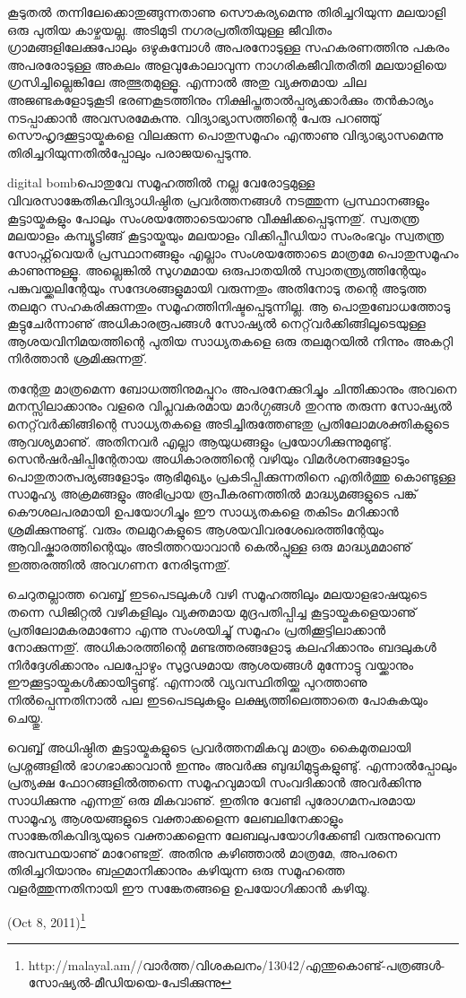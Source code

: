 കൂടുതല്‍ തന്നിലേക്കൊതുങ്ങുന്നതാണു സൌകര്യമെന്നു തിരിച്ചറിയുന്ന മലയാളി ഒരു പുതിയ കാഴ്ചയല്ല. അടിമുടി നഗരപ്രതീതിയുള്ള
 ജീവിതം ഗ്രാമങ്ങളിലേക്കുപോലും ഒഴുകുമ്പോള്‍ അപരനോടുള്ള സഹകരണത്തിനു പകരം അപരരോടുള്ള അകലം അളവുകോലാവുന്ന 
നാഗരികജീവിതരീതി മലയാളിയെ ഗ്രസിച്ചില്ലെങ്കിലേ അത്ഭുതമുള്ളൂ. എന്നാല്‍ അതു വ്യക്തമായ ചില അജണ്ടകളോടുകൂടി ഭരണകൂടത്തിനും
 നിക്ഷിപ്തതാല്‍പ്പര്യക്കാര്‍ക്കും തന്‍കാര്യം നടപ്പാക്കാന്‍ അവസരമേകുന്നു. വിദ്യാഭ്യാസത്തിന്റെ പേരു പറഞ്ഞു് സൌഹൃദക്കൂട്ടായ്മകളെ 
വിലക്കുന്ന പൊതുസമൂഹം എന്താണു വിദ്യാഭ്യാസമെന്നു തിരിച്ചറിയുന്നതില്‍പ്പോലും പരാജയപ്പെടുന്നു.

digital bombപൊതുവേ സമൂഹത്തില്‍ നല്ല വേരോട്ടമുള്ള വിവരസാങ്കേതികവിദ്യാധിഷ്ഠിത പ്രവര്‍ത്തനങ്ങള്‍ നടത്തുന്ന 
പ്രസ്ഥാനങ്ങളും കൂട്ടായ്മകളും പോലും സംശയത്തോടെയാണു വീക്ഷിക്കപ്പെടുന്നതു്. സ്വതന്ത്ര മലയാളം കമ്പ്യൂട്ടിങ്ങ് കൂട്ടായ്മയും മലയാളം 
വിക്കിപ്പീഡിയാ സംരംഭവും സ്വതന്ത്ര സോഫ്റ്റ്‌വെയര്‍ പ്രസ്ഥാനങ്ങളും എല്ലാം സംശയത്തോടെ മാത്രമേ പൊതുസമൂഹം കാണുന്നുള്ളൂ.
 അല്ലെങ്കില്‍ സുഗമമായ ഒരുപാതയില്‍ സ്വാതന്ത്ര്യത്തിന്റേയും പങ്കുവയ്ക്കലിന്റേയും സന്ദേശങ്ങളുമായി വരുന്നതും അതിനോടു തന്റെ
 അടുത്ത തലമുറ സഹകരിക്കുന്നതും സമൂഹത്തിനിഷ്ടപ്പെടുന്നില്ല. ആ പൊതുബോധത്തോടു കൂട്ടുചേര്‍ന്നാണു് അധികാരരൂപങ്ങള്‍ 
സോഷ്യല്‍ നെറ്റ്‌വര്‍ക്കിങ്ങിലൂടെയുള്ള ആശയവിനിമയത്തിന്റെ പുതിയ സാധ്യതകളെ ഒരു തലമുറയില്‍ നിന്നും അകറ്റി നിര്‍ത്താന്‍ 
ശ്രമിക്കുന്നതു്.

തന്റേതു മാത്രമെന്ന ബോധത്തിനുമപ്പുറം അപരനേക്കുറിച്ചും ചിന്തിക്കാനും അവനെ മനസ്സിലാക്കാനും വളരെ വിപ്ലവകരമായ 
മാര്‍ഗ്ഗങ്ങള്‍ തുറന്നു തരുന്ന സോഷ്യല്‍ നെറ്റ്‌വര്‍ക്കിങ്ങിന്റെ സാധ്യതകളെ അടിച്ചിരുത്തേണ്ടതു പ്രതിലോമശക്തികളുടെ
 ആവശ്യമാണു്. അതിനവര്‍ എല്ലാ ആയുധങ്ങളും പ്രയോഗിക്കുന്നുമുണ്ടു്. സെന്‍ഷര്‍ഷിപ്പിന്റേതായ അധികാരത്തിന്റെ വഴിയും 
വിമര്‍ശനങ്ങളോടും പൊതുതാത്പര്യങ്ങളോടും ആഭിമുഖ്യം പ്രകടിപ്പിക്കുന്നതിനെ എതിര്‍ത്തു കൊണ്ടുള്ള സാമൂഹ്യ അക്രമങ്ങളും 
അഭിപ്രായ രൂപീകരണത്തില്‍ മാദ്ധ്യമങ്ങളുടെ പങ്ക് കൌശലപരമായി ഉപയോഗിച്ചും ഈ സാധ്യതകളെ തകിടം മറിക്കാന്‍ 
ശ്രമിക്കുന്നുണ്ടു്. വരും തലമുറകളുടെ ആശയവിവരശേഖരത്തിന്റേയും ആവിഷ്കാരത്തിന്റെയും അടിത്തറയാവാന്‍ കെല്‍പ്പുള്ള ഒരു 
മാദ്ധ്യമമാണു് ഇത്തരത്തില്‍ അവഗണന നേരിടുന്നതു്.

ചെറുതല്ലാത്ത വെബ്ബ് ഇടപെടലുകള്‍ വഴി സമൂഹത്തിലും മലയാളഭാഷയുടെ തന്നെ ഡിജിറ്റല്‍ വഴികളിലും വ്യക്തമായ മുദ്രപതിപ്പിച്ച 
കൂട്ടായ്മകളെയാണു് പ്രതിലോമകരമാണോ എന്നു സംശയിച്ചു് സമൂഹം പ്രതിക്കൂട്ടിലാക്കാന്‍ നോക്കുന്നതു്. അധികാരത്തിന്റെ 
മണ്ടത്തരങ്ങളോടു കലഹിക്കാനും ബദലുകള്‍ നിര്‍ദ്ദേശിക്കാനും പലപ്പോഴും സുദൃഢമായ ആശയങ്ങള്‍ മുന്നോട്ടു വയ്ക്കാനും 
ഈക്കൂട്ടായ്മകള്‍ക്കായിട്ടുണ്ടു്. എന്നാല്‍ വ്യവസ്ഥിതിയ്ക്കു പുറത്താണു നില്‍പ്പെന്നതിനാല്‍ പല ഇടപെടലുകളും ലക്ഷ്യത്തിലെത്താതെ
 പോകുകയും ചെയ്തു.

വെബ്ബ് അധിഷ്ഠിത കൂട്ടായ്മകളുടെ പ്രവര്‍ത്തനമികവു മാത്രം കൈമുതലായി പ്രശ്നങ്ങളില്‍ ഭാഗഭാക്കാവാന്‍ ഇന്നും അവര്‍ക്കു 
ബുദ്ധിമുട്ടുകളുണ്ടു്. എന്നാല്‍പ്പോലും പ്രത്യക്ഷ ഫോറങ്ങളില്‍ത്തന്നെ സമൂഹവുമായി സംവദിക്കാന്‍ അവര്‍ക്കിന്നു സാധിക്കുന്നു 
എന്നതു് ഒരു മികവാണു്. ഇതിനു വേണ്ടി പുരോഗമനപരമായ സാമൂഹ്യ ആശയങ്ങളുടെ വക്താക്കളെന്ന ലേബലിനേക്കാളും 
സാങ്കേതികവിദ്യയുടെ വക്താക്കളെന്ന ലേബലുപയോഗിക്കേണ്ടി വരുന്നുവെന്ന അവസ്ഥയാണു് മാറേണ്ടതു്. അതിനു കഴിഞ്ഞാല്‍ 
മാത്രമേ, അപരനെ തിരിച്ചറിയാനും ബഹുമാനിക്കാനും കഴിയുന്ന ഒരു സമൂഹത്തെ വളര്‍ത്തുന്നതിനായി ഈ സങ്കേതങ്ങളെ
 ഉപയോഗിക്കാന്‍ കഴിയൂ.

(Oct 8, 2011)\footnote{http://malayal.am//വാര്‍ത്ത/വിശകലനം/13042/എന്തുകൊണ്ട്-പത്രങ്ങള്‍-സോഷ്യല്‍-മീഡിയയെ-പേടിക്കുന്നു}
\newpage
